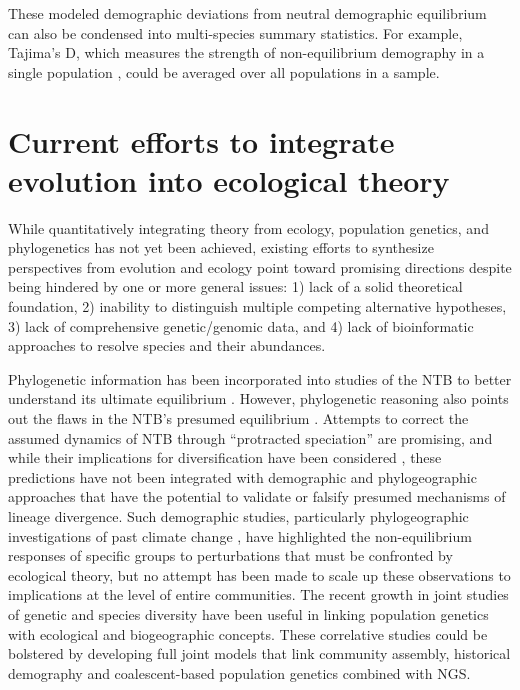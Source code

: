 \documentclass[12pt]{article}
\begin{document}
These modeled demographic deviations from neutral demographic
equilibrium can also be condensed into multi-species summary
statistics. For example, Tajima's D, which measures the strength of
non-equilibrium demography in a single population \citep[see Glossary
for more details;][]{tajima1989, jensen2005, schrider2016,
  stephan2016}, could be averaged over all populations in a sample.


\section{Current efforts to integrate evolution into ecological theory} \label{sec:toDate}

While quantitatively integrating theory from ecology, population
genetics, and phylogenetics has not yet been achieved, existing
efforts to synthesize perspectives from evolution and ecology point
toward promising directions despite being hindered by one or more
general issues: 1) lack of a solid theoretical foundation, 2)
inability to distinguish multiple competing alternative hypotheses, 3)
lack of comprehensive genetic/genomic data, and 4) lack of
bioinformatic approaches to resolve species and their abundances.

Phylogenetic information has been incorporated into studies of the NTB
to better understand its ultimate equilibrium \citep{jabot2009,
  burbrink2015}.  However, phylogenetic reasoning also points out the
flaws in the NTB's presumed equilibrium \citep{ricklefs2006}.
Attempts to correct the assumed dynamics of NTB through ``protracted
speciation'' \citep{rosindell2010} are promising, and while their
implications for diversification have been considered
\citep{etienne2011}, these predictions have not been integrated with
demographic and phylogeographic approaches
\citep[e.g.,][]{charlesworth2010, edwards2000, prado-martinez2013}
that have the potential to validate or falsify presumed mechanisms of
lineage divergence.  Such demographic studies, particularly
phylogeographic investigations of past climate change
\citep{smith2012, hickerson2005}, have highlighted the non-equilibrium
responses of specific groups to perturbations that must be confronted
by ecological theory, but no attempt has been made to scale up these
observations to implications at the level of entire communities. The
recent growth in joint studies of genetic and species diversity
\citep{vellend2005amnat, papadopoulou2011} have been useful in linking
population genetics with ecological and biogeographic concepts. These
correlative studies could be bolstered by developing full joint models
that link community assembly, historical demography and
coalescent-based population genetics combined with NGS.
\end{document}
